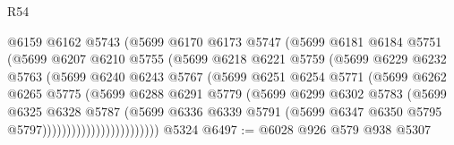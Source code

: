 \begin{lexlean}{R54}
\begin{coremodule}
                          @6159
                          @6162
                          @5743
                          (@5699
                            @6170
                            @6173
                            @5747
                            (@5699
                              @6181
                              @6184
                              @5751
                              (@5699
                                @6207
                                @6210
                                @5755
                                (@5699
                                  @6218
                                  @6221
                                  @5759
                                  (@5699
                                    @6229
                                    @6232
                                    @5763
                                    (@5699
                                      @6240
                                      @6243
                                      @5767
                                      (@5699
                                        @6251
                                        @6254
                                        @5771
                                        (@5699
                                          @6262
                                          @6265
                                          @5775
                                          (@5699
                                            @6288
                                            @6291
                                            @5779
                                            (@5699
                                              @6299
                                              @6302
                                              @5783
                                              (@5699
                                                @6325
                                                @6328
                                                @5787
                                                (@5699
                                                  @6336
                                                  @6339
                                                  @5791
                                                  (@5699
                                                    @6347
                                                    @6350
                                                    @5795
                                                    @5797))))))))))))))))))))))))
    @5324
@6497 := @6028 @926 @579 @938 @5307

\end{coremodule}
\end{lexlean}
